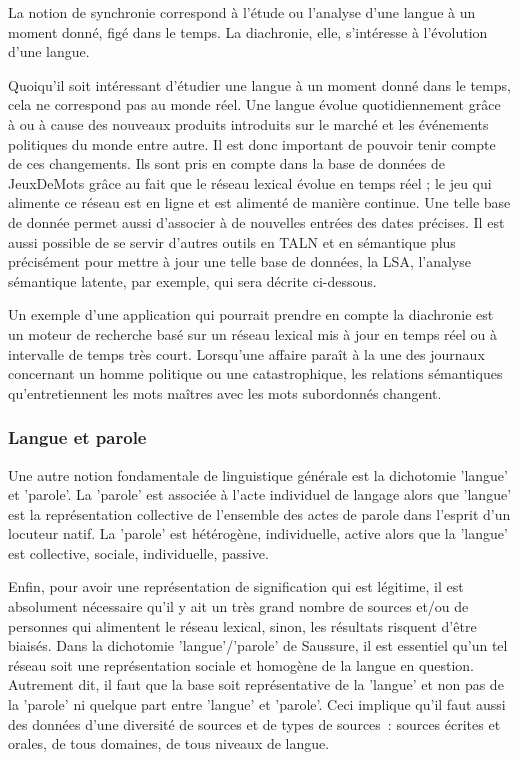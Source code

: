 \documentclass[a4paper,11pt,french]{article}
\begin{document}
La notion de synchronie correspond à l'étude ou l'analyse d'une langue à un moment donné, figé dans le temps. La diachronie, elle, s'intéresse à l'évolution d'une langue.

Quoiqu'il soit intéressant d'étudier une langue à un moment donné dans le temps, cela ne correspond pas au monde réel. Une langue évolue quotidiennement grâce à ou à cause des nouveaux produits introduits sur le marché et les événements politiques du monde entre autre. Il est donc important de pouvoir tenir compte de ces changements. Ils sont pris en compte dans la base de données de JeuxDeMots grâce au fait que le réseau lexical évolue en temps réel ; le jeu qui alimente ce réseau est en ligne et est alimenté de manière continue. Une telle base de donnée permet aussi d'associer à de nouvelles entrées des dates précises. Il est aussi possible de se servir d'autres outils en TALN et en sémantique plus précisément pour mettre à jour une telle base de données, la LSA, l'analyse sémantique latente, par exemple, qui sera décrite ci-dessous.

Un exemple d'une application qui pourrait prendre en compte la diachronie est un moteur de recherche basé sur un réseau lexical mis à jour en temps réel ou à intervalle de temps très court. Lorsqu'une affaire paraît à la une des journaux concernant un homme politique ou une catastrophique, les relations sémantiques qu'entretiennent les mots maîtres avec les mots subordonnés changent.

\subsubsection{Langue et parole}

Une autre notion fondamentale de linguistique générale est la dichotomie 'langue' et 'parole'. La 'parole' est associée à l'acte individuel de langage alors que 'langue' est la représentation collective de l'ensemble des actes de parole dans l'esprit d'un locuteur natif. La 'parole' est hétérogène, individuelle, active alors que la 'langue' est collective, sociale, individuelle, passive. 

Enfin, pour avoir une représentation de signification qui est légitime, il est absolument nécessaire qu'il y ait un très grand nombre de sources et/ou de personnes qui alimentent le réseau lexical, sinon, les résultats risquent d'être biaisés. Dans la dichotomie 'langue'/'parole' de Saussure, il est essentiel qu'un tel réseau soit une représentation sociale et homogène de la langue en question. Autrement dit, il faut que la base soit représentative de la 'langue' et non pas de la 'parole' ni quelque part entre 'langue' et 'parole'. Ceci implique qu'il faut aussi des données d'une diversité de sources et de types de sources~: sources écrites et orales, de tous domaines, de tous niveaux de langue. 
\end{document}

